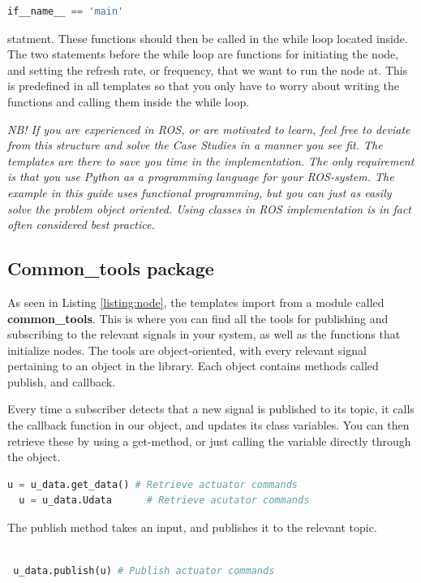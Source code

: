 \documentclass{ol-softwaremanual}
\begin{document}
\begin{lstlisting}[language=python]
    if__name__ == 'main'
\end{lstlisting}

statment. These functions should then be called in the while loop located inside. The two statements before the while loop are functions for initiating the node, and setting the refresh rate, or frequency, that we want to run the node at. This is predefined in all templates so that you only have to worry about writing the functions and calling them inside the while loop.


\textit{NB! If you are experienced in ROS, or are motivated to learn, feel free to deviate from this structure and solve the Case Studies in a manner you see fit. The templates are there to save you time in the implementation. The only requirement is that you use Python as a programming language for your ROS-system. The example in this guide uses functional programming, but you can just as easily solve the problem object oriented. Using classes in ROS implementation is in fact often considered best practice.}

\subsection{Common\_tools package}

As seen in Listing \ref{listing:node}, the templates import from a module called \textbf{common\_tools}. This is where you can find all the tools for publishing and subscribing to the relevant signals in your system, as well as the functions that initialize nodes. The tools are object-oriented, with every relevant signal pertaining to an object in the library. Each object contains methods called publish, and callback. 

Every time a subscriber detects that a new signal is published to its topic, it calls the callback function in our  object, and updates its class variables. You can then retrieve these by using a get-method, or just calling the variable directly through the object.

\begin{lstlisting}[language=python]
  u = u_data.get_data() # Retrieve actuator commands 
  u = u_data.Udata      # Retrieve acutator commands
\end{lstlisting}

The publish method takes an input, and publishes it to the relevant topic.


\begin{lstlisting}[language=python]

 u_data.publish(u) # Publish actuator commands 
\end{lstlisting}
\end{document}

